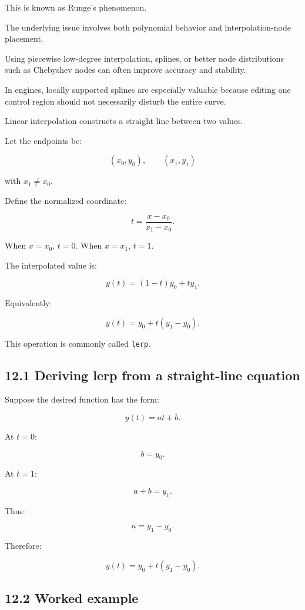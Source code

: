 This is known as Runge's phenomenon.

The underlying issue involves both polynomial behavior and interpolation-node placement.

Using piecewise low-degree interpolation, splines, or better node distributions such as Chebyshev nodes can often improve accuracy and stability.

In engines, locally supported splines are especially valuable because editing one control region should not necessarily disturb the entire curve.

Linear interpolation constructs a straight line between two values.

Let the endpoints be:

\[ (x_0,y_0),\qquad(x_1,y_1) \]

with \(x_1\ne x_0\).

Define the normalized coordinate:

\[ \boxed{ t=\frac{x-x_0}{x_1-x_0} }. \]

When \(x=x_0\), \(t=0\). When \(x=x_1\), \(t=1\).

The interpolated value is:

\[ \boxed{ y(t)=(1-t)y_0+ty_1 }. \]

Equivalently:

\[ \boxed{ y(t)=y_0+t(y_1-y_0) }. \]

This operation is commonly called \texttt{lerp}.

\subsection{12.1 Deriving lerp from a straight-line equation}\label{02-foundations-ii-ch028-deriving-lerp-from-a-straight-line-equation}

Suppose the desired function has the form:

\[ y(t)=at+b. \]

At \(t=0\):

\[ b=y_0. \]

At \(t=1\):

\[ a+b=y_1. \]

Thus:

\[ a=y_1-y_0. \]

Therefore:

\[ y(t)=y_0+t(y_1-y_0). \]

\subsection{12.2 Worked example}\label{02-foundations-ii-ch028-worked-example-1}

